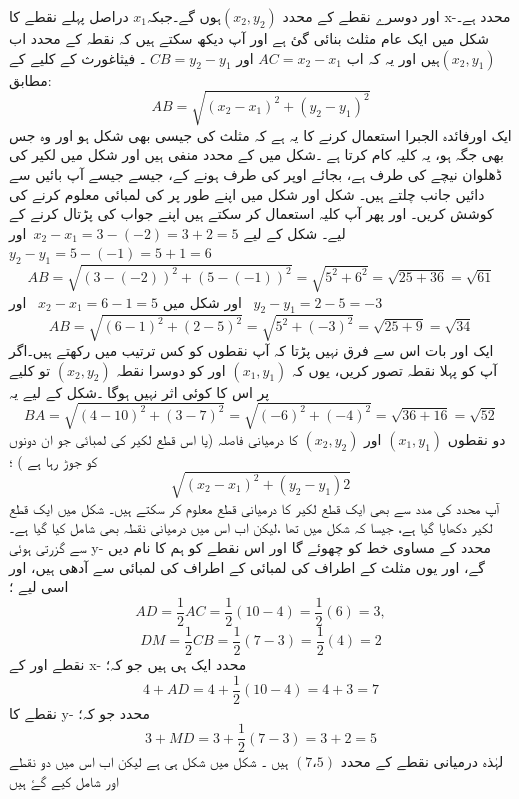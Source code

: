 اور دوسرے نقطے کے محدد  \((x_{2},y_{2})\)ہوں گے۔جبکہ\( x_{1} \) دراصل پہلے نقطے کا x-محدد ہے۔
شکل  میں ایک عام مثلث بنائی گئ ہے اور آپ دیکھ سکتے ہیں کہ   نقطہ    کے محدد اب  \((x_{2},y_{1})\)ہیں اور یہ کہ اب \(AC = x_2 - x_1 \) اور \(CB=y_2 -y_1 \) ۔
فیثاغورث کے کلیے کے مطابق:
\[ AB = \sqrt{(x_2 - x_1)^2 + (y_2 - y_1 )^2} \]
ایک اورفائدہ الجبرا استعمال کرنے کا یہ ہے کہ مثلث کی جیسی بھی شکل ہو اور وہ جس بھی جگہ ہو، یہ کلیہ کام کرتا ہے  ۔شکل  میں  کے  محدد منفی ہیں اور شکل   میں لکیر کی ڈھلوان نیچے کی طرف ہے، بجائے اوپر کی طرف ہونے کے، جیسے جیسے آپ بائیں سے دائیں جانب چلتے ہیں۔ شکل  اور شکل  میں اپنے طور پر   کی لمبائی معلوم کرنے کی کوشش کریں۔ اور پھر آپ کلیہ استعمال کر سکتے ہیں اپنے جواب کی پڑتال کرنے کے لیے۔
شکل  کے لیے
\( x_2 - x_1 = 3-(-2) = 3+2 = 5\)\, اور \, \(y_2 - y_1 = 5-(-1) = 5+1 = 6\)
\[ AB = \sqrt{(3-(-2))^2 +(5-(-1))^2}= \sqrt{5^2 + 6^2} = \sqrt{25+36} =\sqrt{61}\]
اور  شکل   میں 
\( x_2 - x_1 = 6-1 = 5\) \, اور \, \(y_2 -y_1 = 2-5 = -3\)
 \[ AB = \sqrt{(6-1)^2 + (2-5)^2 }= \sqrt{5^2 + (-3)^2} = \sqrt{25 + 9} = \sqrt{34}\]
ایک اور بات اس سے فرق نہیں پڑتا کہ آپ نقطوں کو کس ترتیب میں رکھتے ہیں۔اگر آپ  کو پہلا نقطہ تصور کریں، یوں کہ   \((x_{1},y_{1})\)  اور   کو  دوسرا نقطہ      \((x_{2},y_{2})\)  تو کلیے پر اس کا کوئی اثر نہیں ہوگا ۔شکل کے لیے یہ 
\[ BA = \sqrt{(4-10)^2 + (3-7)^2} = \sqrt{(-6)^2 + (-4)^2 } = \sqrt{36+16} = \sqrt{52}\]
دو نقطوں  \((x_{1},y_{1})\) اور  \((x_{2},y_{2})\) کا درمیانی فاصلہ (یا اس قطع لکیر کی لمبائی جو ان دونوں کو جوڑ رہا ہے ) ؛
\[ \sqrt{(x_2-x_1)^2 + (y_2 - y_1)2}\]
آپ محدد کی مدد سے بھی ایک قطع لکیر کا درمیانی قطع معلوم کر سکتے ہیں۔
شکل میں ایک قطع لکیر دکھایا گیا ہے،  جیسا کہ شکل  میں تھا ،لیکن اب اس میں درمیانی نقطہ    بھی شامل کیا گیا ہے۔   سے گزرتی ہوئی   y- محدد کے مساوی خط     کو چھوئے گا اور اس نقطے کو ہم    کا  نام دیں گے، اور یوں مثلث   کے اطراف کی لمبائی    کے اطراف کی لمبائی   سے   آدھی ہیں، اور اسی لیے ؛   \[ AD = \frac{1}{2} AC = \frac{1}{2} (10-4) = \frac{1}{2} (6)= 3,\]
\[ DM = \frac{1}{2} CB= \frac{1}{2} (7-3) = \frac{1}{2} (4)=2\]
نقطے   اور   کے x- محدد ایک ہی ہیں جو کہ؛
\[ 4+AD=4+ \frac{1}{2} (10-4) = 4+3 =7\] 
نقطے    کا y- محدد جو کہ؛
\[ 3+MD = 3+ \frac{1}{2} (7-3) = 3+2 = 5\]
لہٰذہ درمیانی  نقطے     کے محدد    \( (7،5 )  \) ہیں ۔
شکل  میں شکل  ہی ہے لیکن اب اس میں دو نقطے   اور   شامل کیے گۓ ہیں 
